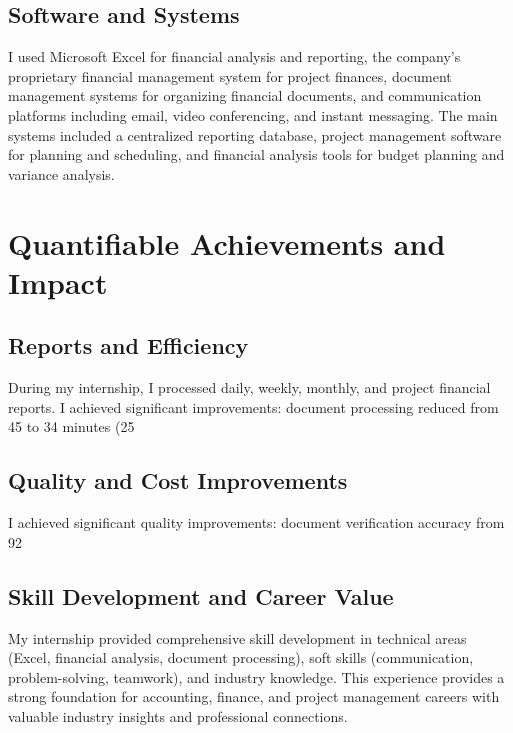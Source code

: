 \subsection{Software and Systems}
I used Microsoft Excel for financial analysis and reporting, the company's proprietary financial management system for project finances, document management systems for organizing financial documents, and communication platforms including email, video conferencing, and instant messaging. The main systems included a centralized reporting database, project management software for planning and scheduling, and financial analysis tools for budget planning and variance analysis.

\vspace{0.5em}
\section{Quantifiable Achievements and Impact}

\subsection{Reports and Efficiency}
During my internship, I processed daily, weekly, monthly, and project financial reports. I achieved significant improvements: document processing reduced from 45 to 34 minutes (25%

\subsection{Quality and Cost Improvements}
I achieved significant quality improvements: document verification accuracy from 92%

\subsection{Skill Development and Career Value}
My internship provided comprehensive skill development in technical areas (Excel, financial analysis, document processing), soft skills (communication, problem-solving, teamwork), and industry knowledge. This experience provides a strong foundation for accounting, finance, and project management careers with valuable industry insights and professional connections.

